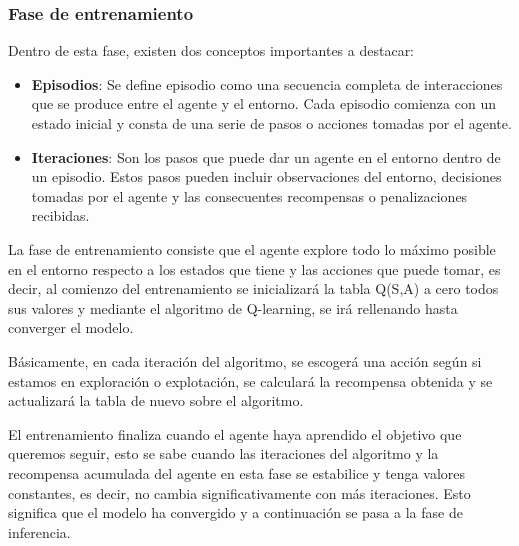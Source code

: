 \subsubsection{Fase de entrenamiento}
\label{sec:entrenamiento}
 Dentro de esta fase, existen dos conceptos importantes a destacar:
 \begin{itemize}
  \item \textbf{Episodios}: Se define episodio como una secuencia completa de interacciones que se produce entre el agente y el entorno. Cada episodio comienza con un estado inicial y consta de una serie 
  de pasos o acciones tomadas por el agente.
  \item \textbf{Iteraciones}: Son los pasos que puede dar un agente en el entorno dentro de un episodio. Estos pasos pueden incluir observaciones del entorno, decisiones tomadas por el agente
  y las consecuentes recompensas o penalizaciones recibidas.
\end{itemize}

 La fase de entrenamiento consiste que el agente explore todo lo máximo posible en el entorno respecto a los estados que tiene y las acciones que puede tomar, es decir, al comienzo del 
 entrenamiento se inicializará la tabla Q(S,A) a cero todos sus valores y mediante el algoritmo de Q-learning, se irá rellenando hasta converger el modelo. \newline
 
 Básicamente, en cada iteración del algoritmo, se escogerá una acción según si estamos en exploración o explotación, se calculará la recompensa obtenida y se actualizará la tabla de nuevo sobre el algoritmo.

 El entrenamiento finaliza cuando el agente haya aprendido el objetivo que queremos seguir, esto se sabe cuando las iteraciones del algoritmo y la recompensa acumulada del agente en esta 
 fase se estabilice y tenga valores constantes, es decir, no cambia significativamente con más iteraciones. Esto significa que el modelo ha convergido y a continuación se pasa
 a la fase de inferencia. \newline

